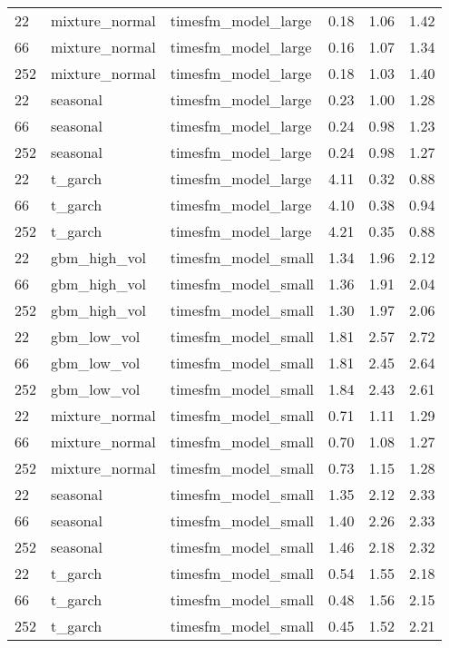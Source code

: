 {\begin{tabular}{lllrrr}
\midrule
22 & mixture\_normal & timesfm\_model\_large & 0.18 & 1.06 & 1.42 \\
66 & mixture\_normal & timesfm\_model\_large & 0.16 & 1.07 & 1.34 \\
252 & mixture\_normal & timesfm\_model\_large & 0.18 & 1.03 & 1.40 \\
\midrule
22 & seasonal & timesfm\_model\_large & 0.23 & 1.00 & 1.28 \\
66 & seasonal & timesfm\_model\_large & 0.24 & 0.98 & 1.23 \\
252 & seasonal & timesfm\_model\_large & 0.24 & 0.98 & 1.27 \\
\midrule
22 & t\_garch & timesfm\_model\_large & 4.11 & 0.32 & 0.88 \\
66 & t\_garch & timesfm\_model\_large & 4.10 & 0.38 & 0.94 \\
252 & t\_garch & timesfm\_model\_large & 4.21 & 0.35 & 0.88 \\
\midrule
22 & gbm\_high\_vol & timesfm\_model\_small & 1.34 & 1.96 & 2.12 \\
66 & gbm\_high\_vol & timesfm\_model\_small & 1.36 & 1.91 & 2.04 \\
252 & gbm\_high\_vol & timesfm\_model\_small & 1.30 & 1.97 & 2.06 \\
\midrule
22 & gbm\_low\_vol & timesfm\_model\_small & 1.81 & 2.57 & 2.72 \\
66 & gbm\_low\_vol & timesfm\_model\_small & 1.81 & 2.45 & 2.64 \\
252 & gbm\_low\_vol & timesfm\_model\_small & 1.84 & 2.43 & 2.61 \\
\midrule
22 & mixture\_normal & timesfm\_model\_small & 0.71 & 1.11 & 1.29 \\
66 & mixture\_normal & timesfm\_model\_small & 0.70 & 1.08 & 1.27 \\
252 & mixture\_normal & timesfm\_model\_small & 0.73 & 1.15 & 1.28 \\
\midrule
22 & seasonal & timesfm\_model\_small & 1.35 & 2.12 & 2.33 \\
66 & seasonal & timesfm\_model\_small & 1.40 & 2.26 & 2.33 \\
252 & seasonal & timesfm\_model\_small & 1.46 & 2.18 & 2.32 \\
\midrule
22 & t\_garch & timesfm\_model\_small & 0.54 & 1.55 & 2.18 \\
66 & t\_garch & timesfm\_model\_small & 0.48 & 1.56 & 2.15 \\
252 & t\_garch & timesfm\_model\_small & 0.45 & 1.52 & 2.21 \\

\end{tabular}}
